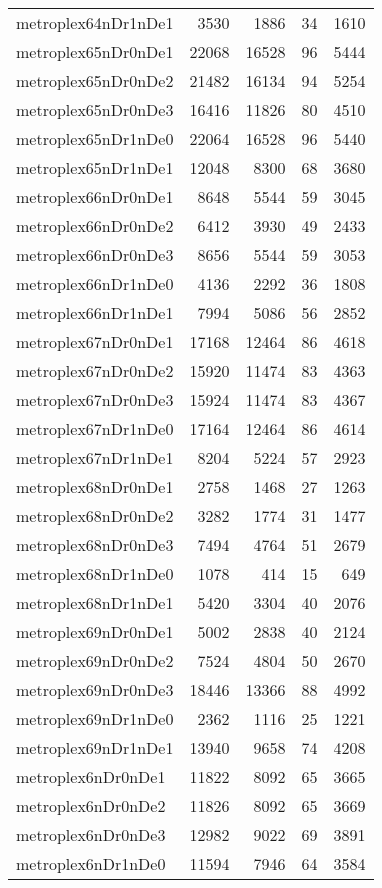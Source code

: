\begin{tabular}{lrrrr}
metroplex64nDr1nDe1 & 3530 & 1886 & 34 & 1610 \\
metroplex65nDr0nDe1 & 22068 & 16528 & 96 & 5444 \\
metroplex65nDr0nDe2 & 21482 & 16134 & 94 & 5254 \\
metroplex65nDr0nDe3 & 16416 & 11826 & 80 & 4510 \\
metroplex65nDr1nDe0 & 22064 & 16528 & 96 & 5440 \\
metroplex65nDr1nDe1 & 12048 & 8300 & 68 & 3680 \\
metroplex66nDr0nDe1 & 8648 & 5544 & 59 & 3045 \\
metroplex66nDr0nDe2 & 6412 & 3930 & 49 & 2433 \\
metroplex66nDr0nDe3 & 8656 & 5544 & 59 & 3053 \\
metroplex66nDr1nDe0 & 4136 & 2292 & 36 & 1808 \\
metroplex66nDr1nDe1 & 7994 & 5086 & 56 & 2852 \\
metroplex67nDr0nDe1 & 17168 & 12464 & 86 & 4618 \\
metroplex67nDr0nDe2 & 15920 & 11474 & 83 & 4363 \\
metroplex67nDr0nDe3 & 15924 & 11474 & 83 & 4367 \\
metroplex67nDr1nDe0 & 17164 & 12464 & 86 & 4614 \\
metroplex67nDr1nDe1 & 8204 & 5224 & 57 & 2923 \\
metroplex68nDr0nDe1 & 2758 & 1468 & 27 & 1263 \\
metroplex68nDr0nDe2 & 3282 & 1774 & 31 & 1477 \\
metroplex68nDr0nDe3 & 7494 & 4764 & 51 & 2679 \\
metroplex68nDr1nDe0 & 1078 & 414 & 15 & 649 \\
metroplex68nDr1nDe1 & 5420 & 3304 & 40 & 2076 \\
metroplex69nDr0nDe1 & 5002 & 2838 & 40 & 2124 \\
metroplex69nDr0nDe2 & 7524 & 4804 & 50 & 2670 \\
metroplex69nDr0nDe3 & 18446 & 13366 & 88 & 4992 \\
metroplex69nDr1nDe0 & 2362 & 1116 & 25 & 1221 \\
metroplex69nDr1nDe1 & 13940 & 9658 & 74 & 4208 \\
metroplex6nDr0nDe1 & 11822 & 8092 & 65 & 3665 \\
metroplex6nDr0nDe2 & 11826 & 8092 & 65 & 3669 \\
metroplex6nDr0nDe3 & 12982 & 9022 & 69 & 3891 \\
metroplex6nDr1nDe0 & 11594 & 7946 & 64 & 3584 \\

\end{tabular}

